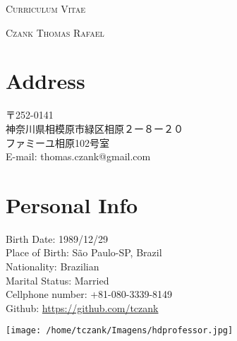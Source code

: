 \documentclass[a4paper]{article}
\begin{document}
\pagestyle{empty}

\begin{center}
\huge{\textsc{Curriculum Vitae}}
\vspace{\baselineskip}

\Large{\textsc{Czank Thomas Rafael}}
\end{center}
\vspace{1.5\baselineskip}

\section{Address}
\begin{CJK}{UTF8}{ipxm}
  \begin{flushleft}
〒252-0141 　\\
神奈川県相模原市緑区相原２ー８ー２０ \\
ファミーユ相原102号室 \\
E-mail: thomas.czank@gmail.com\\
\end{flushleft}
\end{CJK}

\section{Personal Info}
\begin{minipage}{0.5\textwidth}
\begin{flushleft}
  Birth Date: 1989/12/29  \\
  Place of Birth: São Paulo-SP, Brazil \\
  Nationality: Brazilian \\
  Marital Status: Married\\
  Cellphone number: +81-080-3339-8149\\
  Github: \url{https://github.com/tczank}
\end{flushleft}
\end{minipage}
\hfill
\begin{minipage}{0.5\textwidth}
\begin{flushright}
\hspace*{-2cm}
\texttt{[image: /home/tczank/Imagens/hdprofessor.jpg]}
\end{flushright}
\end{minipage}
\end{document}
